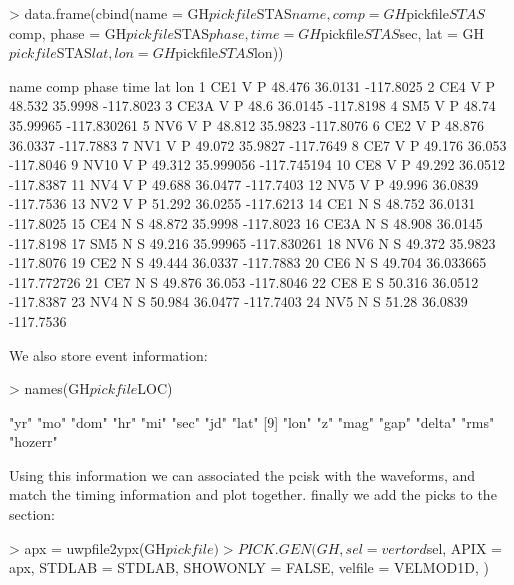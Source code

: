\documentclass{article}
\begin{document}
\begin{Schunk}
\begin{Sinput}
> data.frame(cbind(name = GH$pickfile$STAS$name, comp = GH$pickfile$STAS$comp, 
     phase = GH$pickfile$STAS$phase, time = GH$pickfile$STAS$sec, 
     lat = GH$pickfile$STAS$lat, lon = GH$pickfile$STAS$lon))
\end{Sinput}
\begin{Soutput}
   name comp phase   time       lat         lon
1   CE1    V     P 48.476   36.0131   -117.8025
2   CE4    V     P 48.532   35.9998   -117.8023
3  CE3A    V     P   48.6   36.0145   -117.8198
4   SM5    V     P  48.74  35.99965 -117.830261
5   NV6    V     P 48.812   35.9823   -117.8076
6   CE2    V     P 48.876   36.0337   -117.7883
7   NV1    V     P 49.072   35.9827   -117.7649
8   CE7    V     P 49.176    36.053   -117.8046
9  NV10    V     P 49.312 35.999056 -117.745194
10  CE8    V     P 49.292   36.0512   -117.8387
11  NV4    V     P 49.688   36.0477   -117.7403
12  NV5    V     P 49.996   36.0839   -117.7536
13  NV2    V     P 51.292   36.0255   -117.6213
14  CE1    N     S 48.752   36.0131   -117.8025
15  CE4    N     S 48.872   35.9998   -117.8023
16 CE3A    N     S 48.908   36.0145   -117.8198
17  SM5    N     S 49.216  35.99965 -117.830261
18  NV6    N     S 49.372   35.9823   -117.8076
19  CE2    N     S 49.444   36.0337   -117.7883
20  CE6    N     S 49.704 36.033665 -117.772726
21  CE7    N     S 49.876    36.053   -117.8046
22  CE8    E     S 50.316   36.0512   -117.8387
23  NV4    N     S 50.984   36.0477   -117.7403
24  NV5    N     S  51.28   36.0839   -117.7536
\end{Soutput}
\end{Schunk}
We also store event information:
\begin{Schunk}
\begin{Sinput}
> names(GH$pickfile$LOC)
\end{Sinput}
\begin{Soutput}
 [1] "yr"     "mo"     "dom"    "hr"     "mi"     "sec"    "jd"     "lat"   
 [9] "lon"    "z"      "mag"    "gap"    "delta"  "rms"    "hozerr"
\end{Soutput}
\end{Schunk}

Using this information we can associated the 
pcisk with the waveforms, and match the timing information
and plot together.
finally we add the picks to the section:
\begin{Schunk}
\begin{Sinput}
> apx = uwpfile2ypx(GH$pickfile)
> PICK.GEN(GH, sel = vertord$sel, APIX = apx, STDLAB = STDLAB, 
     SHOWONLY = FALSE, velfile = VELMOD1D, )
\end{Sinput}
\end{Schunk}
\end{document}
